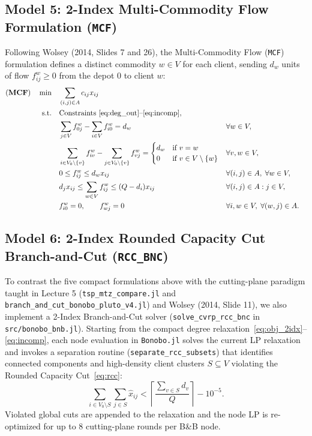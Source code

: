 \documentclass[11pt,a4paper]{article}
\begin{document}
\subsection{Model 5: 2-Index Multi-Commodity Flow Formulation (\texttt{MCF})}
Following Wolsey (2014, Slides 7 and 26), the Multi-Commodity Flow (\texttt{MCF}) formulation defines a distinct commodity $w \in V$ for each client, sending $d_w$ units of flow $f_{ij}^w \ge 0$ from the depot $0$ to client $w$:
\begin{align}
\text{(\textbf{MCF})} \quad \min \quad & \sum_{(i,j) \in A} c_{ij} x_{ij} \nonumber \\
\text{s.t.} \quad & \text{Constraints~\eqref{eq:deg_out}--\eqref{eq:incomp}}, \nonumber \\
& \sum_{j \in V} f_{0j}^w - \sum_{i \in V} f_{i0}^w = d_w && \forall w \in V, \label{eq:mcf_depot} \\
& \sum_{i \in V_0 \setminus \{v\}} f_{iv}^w - \sum_{j \in V_0 \setminus \{v\}} f_{vj}^w = \begin{cases} d_w & \text{if } v = w \\ 0 & \text{if } v \in V \setminus \{w\} \end{cases} && \forall v, w \in V, \label{eq:mcf_cons} \\
& 0 \le f_{ij}^w \le d_w x_{ij} && \forall (i, j) \in A, \; \forall w \in V, \label{eq:mcf_indiv} \\
& d_j x_{ij} \le \sum_{w \in V} f_{ij}^w \le (Q - d_i) x_{ij} && \forall (i, j) \in A : j \in V, \label{eq:mcf_tot} \\
& f_{i0}^w = 0, \qquad f_{wj}^w = 0 && \forall i, w \in V, \; \forall (w, j) \in A. \label{eq:mcf_zero}
\end{align}

\subsection{Model 6: 2-Index Rounded Capacity Cut Branch-and-Cut (\texttt{RCC\_BNC})}
To contrast the five compact formulations above with the cutting-plane paradigm taught in Lecture 5 (\texttt{tsp\_mtz\_compare.jl} and \texttt{branch\_and\_cut\_bonobo\_pluto\_v4.jl}) and Wolsey (2014, Slide 11), we also implement a 2-Index Branch-and-Cut solver (\texttt{solve\_cvrp\_rcc\_bnc} in \texttt{src/bonobo\_bnb.jl}). Starting from the compact degree relaxation~\eqref{eq:obj_2idx}--\eqref{eq:incomp}, each node evaluation in \texttt{Bonobo.jl} solves the current LP relaxation and invokes a separation routine (\texttt{separate\_rcc\_subsets}) that identifies connected components and high-density client clusters $S \subseteq V$ violating the Rounded Capacity Cut~\eqref{eq:rcc}:
\[
\sum_{i \in V_0 \setminus S} \sum_{j \in S} \hat{x}_{ij} < \left\lceil \frac{\sum_{v \in S} d_v}{Q} \right\rceil - 10^{-5}.
\]
Violated global cuts are appended to the relaxation and the node LP is re-optimized for up to 8 cutting-plane rounds per B\&B node.
\end{document}
